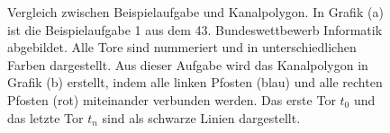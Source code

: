 \begin{figure}[t]
    \caption{Vergleich zwischen Beispielaufgabe und Kanalpolygon. In Grafik (a) ist die Beispielaufgabe 1 aus dem 43. Bundeswettbewerb Informatik abgebildet. Alle Tore sind nummeriert und in unterschiedlichen Farben dargestellt. Aus dieser Aufgabe wird das Kanalpolygon in Grafik (b) erstellt, indem alle linken Pfosten (blau) und alle rechten Pfosten (rot) miteinander verbunden werden. Das erste Tor \(t_0\) und das letzte Tor \(t_n\) sind als schwarze Linien dargestellt.}
\end{figure}
